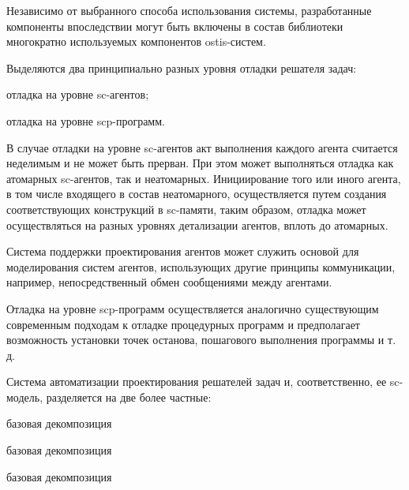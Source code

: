 Независимо от выбранного способа использования системы, разработанные компоненты впоследствии могут быть включены в состав библиотеки многократно используемых компонентов ostis-систем.

Выделяются два принципиально разных уровня отладки решателя задач:
\begin{textitemize}
    \item отладка на уровне sc-агентов;
    \item отладка на уровне scp-программ.
\end{textitemize}

В случае отладки на уровне sc-агентов акт выполнения каждого агента считается неделимым и не может быть прерван. При этом может выполняться отладка как атомарных sc-агентов, так и неатомарных. Инициирование того или иного агента, в том числе входящего в состав неатомарного, осуществляется путем создания соответствующих конструкций в sc-памяти, таким образом, отладка может осуществляться на разных уровнях детализации агентов, вплоть до атомарных.

Система поддержки проектирования агентов может служить основой для моделирования систем агентов, использующих другие принципы коммуникации, например, непосредственный обмен сообщениями между агентами.

Отладка на уровне scp-программ осуществляется аналогично существующим современным подходам к отладке процедурных программ и предполагает возможность установки точек останова, пошагового выполнения программы и т. д.

Система автоматизации проектирования решателей задач и, соответственно, ее sc-модель, разделяется на две более частные:

\begin{SCn}
\begin{scnreltoset}{базовая декомпозиция}
\begin{scnindent}
    \begin{scnreltoset}{базовая декомпозиция}
    \end{scnreltoset}
\end{scnindent}
\begin{scnindent}
    \begin{scnreltoset}{базовая декомпозиция}
    \end{scnreltoset}
\end{scnindent}
\end{scnreltoset}
\end{SCn}

